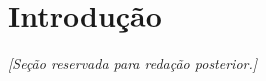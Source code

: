 \section{Introdu\c{c}\~{a}o}\label{sec:introducao}

\noindent\textit{[Se\c{c}\~{a}o reservada para reda\c{c}\~{a}o posterior.]}

